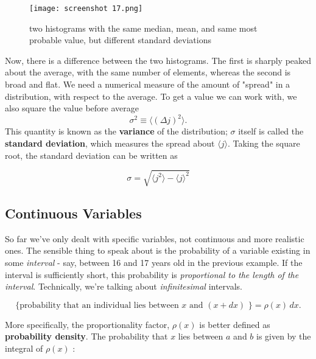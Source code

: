 \documentclass[svgnames]{article}   	%
\begin{document}
\begin{figure}[htb!]
  \centering
    \texttt{[image: screenshot 17.png]}
    \caption{two histograms with the same median, mean, and same most probable
    value, but different standard deviations}
\end{figure}

\vspace{5px}

Now, there is a difference between the two histograms. The first is sharply
peaked about the average, with the same number of elements, whereas the second
is broad and flat. We need a numerical measure of the amount of "spread" in
a distribution, with respect to the average. To get a value we can work with,
we also square the value before average
\vspace{5px} \[
\sigma^2 \equiv \langle (\Delta j)^2 \rangle.
\] \vspace{5px}
This quantity is known as the \textbf{variance} of the distribution; $\sigma$
itself is called the \textbf{standard deviation}, which measures the spread
about $\langle j \rangle$. Taking the square root, the standard deviation can
be written as 

\vspace{5px} \[
\sigma = \sqrt{\langle j^2\rangle - \langle j \rangle ^2}  
\] \vspace{5px}

\subsection{Continuous Variables}

So far we've only dealt with specific variables, not continuous and more
realistic ones. The sensible thing to speak about is the probability of
a variable existing in some \textit{interval} - say, between 16 and 17 years
old in the previous example. If the interval is sufficiently short, this
probability is \textit{proportional to the length of the interval}.
Technically, we're talking about \textit{infinitesimal} intervals. 

\vspace{5px} \[
  \{ \text{probability that an individual lies between $x$ and  $(x + dx)$ \}}
    = \rho(x) \,dx . 
\] \vspace{5px}


More specifically, the proportionality factor, $\rho(x)$ is better defined as
\textbf{probability density}. The probability that $x$ lies between $a$ and $b$
is given by the integral of $\rho(x)$ : 
\end{document}
